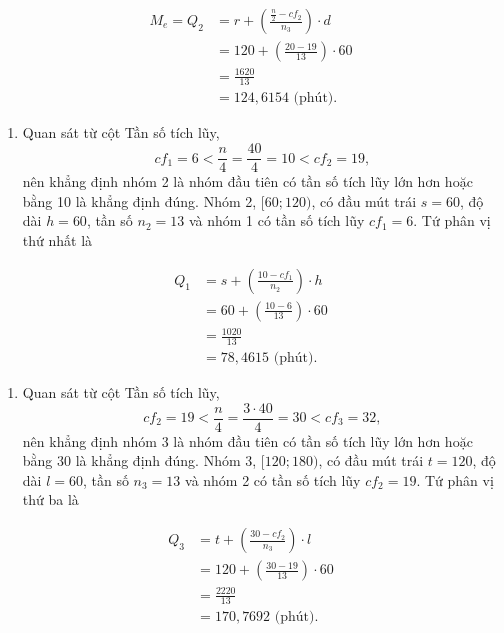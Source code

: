 \documentclass[
  letterpaper,
  DIV=11,
  numbers=noendperiod]{scrartcl}
\providecommand{\tightlist}{%
  \setlength{\itemsep}{0pt}\setlength{\parskip}{0pt}}\usepackage{longtable,booktabs,array}
\begin{document}
\begin{align*}
    M_e = Q_2
        & = r + \left( \frac{\frac{n}{2} - cf_2}{n_3}\right)\cdot d \\
        & = 120 + \left( \frac{20-19}{13}\right)\cdot 60 \\
        & = \frac{1620}{13} \\
        & = 124,6154 \text{ (phút).}
\end{align*}

\begin{enumerate}
\def\labelenumi{\alph{enumi}.}
\setcounter{enumi}{1}
\tightlist
\item
  Quan sát từ cột Tần số tích lũy, \[
   cf_1 = 6 < \frac{n}{4} = \frac{40}{4} = 10 < cf_2 = 19,
  \] nên khẳng định nhóm 2 là nhóm đầu tiên có tần số tích lũy lớn hơn
  hoặc bằng 10 là khẳng định đúng. Nhóm 2, \([60; 120)\), có đầu mút
  trái \(s=60\), độ dài \(h=60\), tần số \(n_2=13\) và nhóm 1 có tần số
  tích lũy \(cf_1 = 6\). Tứ phân vị thứ nhất là
\end{enumerate}

\begin{align*}
    Q_1 
        & = s + \left (\frac{10-cf_1}{n_2}\right)\cdot h \\
        & = 60 + \left(\frac{10-6}{13}\right)\cdot 60 \\
        & = \frac{1020}{13} \\
        & = 78,4615 \text{ (phút).}
\end{align*}

\begin{enumerate}
\def\labelenumi{\alph{enumi}.}
\setcounter{enumi}{2}
\tightlist
\item
  Quan sát từ cột Tần số tích lũy, \[
   cf_2 = 19 < \frac{n}{4} = \frac{3\cdot 40}{4} = 30 < cf_3 = 32,
  \] nên khẳng định nhóm 3 là nhóm đầu tiên có tần số tích lũy lớn hơn
  hoặc bằng 30 là khẳng định đúng. Nhóm 3, \([120;180)\), có đầu mút
  trái \(t=120\), độ dài \(l=60\), tần số \(n_3=13\) và nhóm 2 có tần số
  tích lũy \(cf_2 = 19\). Tứ phân vị thứ ba là
\end{enumerate}

\begin{align*}
    Q_3 
        & = t + \left (\frac{30-cf_2}{n_3}\right)\cdot l \\
        & = 120 + \left(\frac{30-19}{13}\right)\cdot 60 \\
        & = \frac{2220}{13} \\
        & = 170,7692 \text{ (phút).}
\end{align*}
\end{document}

